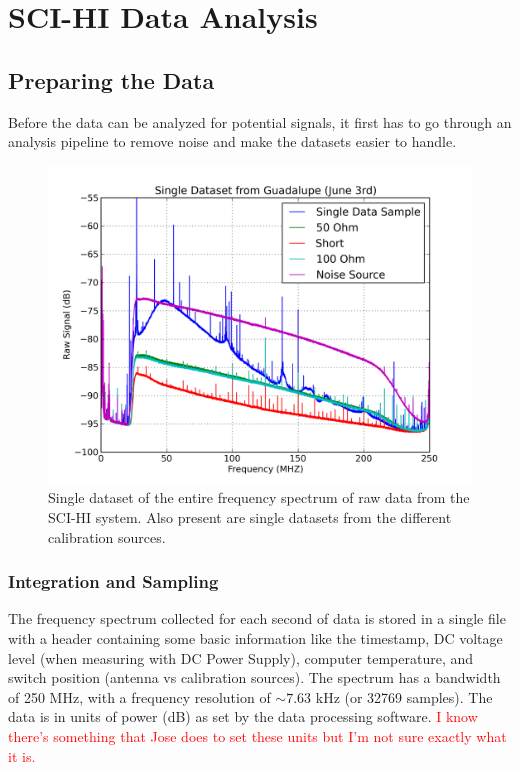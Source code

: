 \chapter{SCI-HI Data Analysis}\label{Ch:Data}

\section{Preparing the Data}

Before the data can be analyzed for potential signals, it first has to go through an analysis pipeline to remove noise and make the datasets easier to handle. 

\begin{figure}[htb]
\begin{center}
\includegraphics[width=0.9\linewidth]{Data_analysis/figures/single_raw_guad_june03.png}
\caption{Single dataset of the entire frequency spectrum of raw data from the SCI-HI system. Also present are single datasets from the different calibration sources.}
\label{Fig:raw_data}
\end{center}
\end{figure}

\subsection{Integration and Sampling}\label{Sec:int}

The frequency spectrum collected for each second of data is stored in a single file with a header containing some basic information like the timestamp, DC voltage level (when measuring with DC Power Supply), computer temperature, and switch position (antenna vs calibration sources). The spectrum has a bandwidth of 250 MHz, with a frequency resolution of $\sim 7.63$ kHz (or 32769 samples). The data is in units of power (dB) as set by the data processing software. \textcolor{red}{I know there's something that Jose does to set these units but I'm not sure exactly what it is.} 

